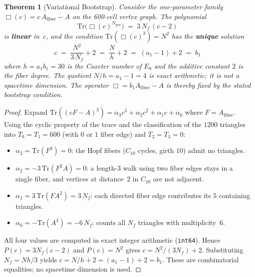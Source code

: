 \documentclass[12pt,a4paper]{article}
\newtheorem{theorem}{Theorem}
\theoremstyle{definition}
\begin{document}
\begin{theorem}[Variational Bootstrap]\label{thm:variational_bootstrap}
Consider the one-parameter family $\Box(c) = c\, A_{\mathrm{fiber}} - A$ on the 600-cell vertex graph.  The polynomial
\begin{equation}
\mathrm{Tr}\!\big(\Box(c)^{N_{\mathrm{gen}}}\big) \;=\; 3\,N_f\,(c - 2)
\label{eq:variational_linear}
\end{equation}
is \textbf{linear} in~$c$, and the condition $\mathrm{Tr}(\Box(c)^3) = N^2$ has the \textbf{unique} solution
\begin{equation}
\boxed{c \;=\; \frac{N^2}{3\,N_f} + 2 \;=\; \frac{N}{h} + 2 \;=\; (a_1-1) + 2 \;=\; b_1}
\label{eq:variational_c}
\end{equation}
where $h=a_1b_1=30$ is the Coxeter number of $E_8$ and the additive constant $2$ is the fiber degree.  The quotient $N/h=a_1-1=4$ is exact arithmetic; it is not a spacetime dimension.  The operator $\Box=b_1A_{\mathrm{fiber}}-A$ is thereby fixed by the stated bootstrap condition.
\end{theorem}

\begin{proof}
Expand $\mathrm{Tr}((cF - A)^3) = \alpha_3 c^3 + \alpha_2 c^2 + \alpha_1 c + \alpha_0$ where $F = A_{\mathrm{fiber}}$.  Using the cyclic property of the trace and the classification of the $1200$ triangles into $T_0 = T_1 = 600$ (with $0$ or $1$ fiber edge) and $T_2 = T_3 = 0$:
\begin{itemize}
\item $\alpha_3 = \mathrm{Tr}(F^3) = 0$: the Hopf fibers ($C_{10}$ cycles, girth $10$) admit no triangles.
\item $\alpha_2 = -3\,\mathrm{Tr}(F^2 A) = 0$: a length-$3$ walk using two fiber edges stays in a single fiber, and vertices at distance~$2$ in $C_{10}$ are not adjacent.
\item $\alpha_1 = 3\,\mathrm{Tr}(F A^2) = 3\,N_f$: each directed fiber edge contributes its $5$ containing triangles.
\item $\alpha_0 = -\mathrm{Tr}(A^3) = -6\,N_f$: counts all $N_f$ triangles with multiplicity~$6$.
\end{itemize}
All four values are computed in exact integer arithmetic (\texttt{int64}).  Hence $P(c)=3N_f(c-2)$ and $P(c)=N^2$ gives $c=N^2/(3N_f)+2$.  Substituting $N_f=Nh/3$ yields $c=N/h+2=(a_1-1)+2=b_1$.  These are combinatorial equalities; no spacetime dimension is used.
\end{proof}
\end{document}
